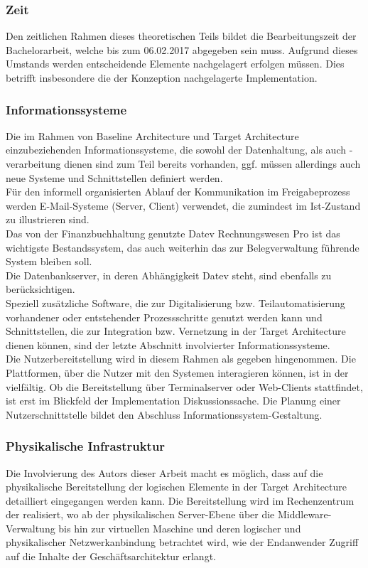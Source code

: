 
\subsubsection{Zeit}
Den zeitlichen Rahmen dieses theoretischen Teils bildet die Bearbeitungszeit der Bachelorarbeit, welche bis zum 06.02.2017 abgegeben sein muss.
Aufgrund dieses Umstands werden entscheidende Elemente nachgelagert erfolgen müssen.
Dies betrifft insbesondere die der Konzeption nachgelagerte Implementation.

\subsubsection{Informationssysteme}
Die im Rahmen von Baseline Architecture und Target Architecture einzubeziehenden Informationssysteme, die sowohl der Datenhaltung, als auch -verarbeitung dienen sind zum Teil bereits vorhanden, ggf. müssen allerdings auch neue Systeme und Schnittstellen definiert werden.
\\[1\baselineskip]
Für den informell organisierten Ablauf der Kommunikation im Freigabeprozess werden E-Mail-Systeme (Server, Client) verwendet, die zumindest im Ist-Zustand zu illustrieren sind.
\\[1\baselineskip]
Das von der Finanzbuchhaltung genutzte Datev Rechnungswesen Pro ist das wichtigste Bestandssystem, das auch weiterhin das zur Belegverwaltung führende System bleiben soll.\\
Die Datenbankserver, in deren Abhängigkeit Datev steht, sind ebenfalls zu berücksichtigen.
\\[1\baselineskip]
Speziell zusätzliche Software, die zur Digitalisierung bzw. Teilautomatisierung vorhandener oder entstehender Prozessschritte genutzt werden kann und Schnittstellen, die zur Integration bzw. Vernetzung in der Target Architecture dienen können, sind der letzte Abschnitt involvierter Informationssysteme.
\\[1\baselineskip]
Die Nutzerbereitstellung wird in diesem Rahmen als gegeben hingenommen. 
Die Plattformen, über die Nutzer mit den Systemen interagieren können, ist in der \firma vielfältig.
Ob die Bereitstellung über Terminalserver oder Web-Clients stattfindet, ist erst im Blickfeld der Implementation Diskussionssache.
Die Planung einer Nutzerschnittstelle bildet den Abschluss Informationssystem-Gestaltung.
\subsubsection{Physikalische Infrastruktur}
Die Involvierung des Autors dieser Arbeit macht es möglich, dass auf die physikalische Bereitstellung der logischen Elemente in der Target Architecture detailliert eingegangen werden kann.
Die Bereitstellung wird im Rechenzentrum der \firma realisiert, wo ab der physikalischen Server-Ebene über die Middleware-Verwaltung bis hin zur virtuellen Maschine und deren logischer und physikalischer Netzwerkanbindung betrachtet wird, wie der Endanwender Zugriff auf die Inhalte der Geschäftsarchitektur erlangt.

